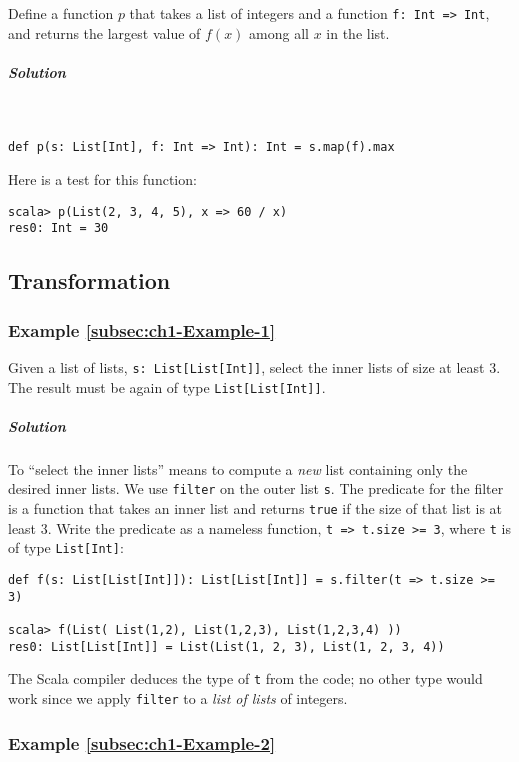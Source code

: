 Define a function $p$ that takes a list of integers and a function
\lstinline!f: Int => Int!, and returns the largest value of $f(x)$
among all $x$ in the list.

\subparagraph{Solution}

~

\begin{lstlisting}
def p(s: List[Int], f: Int => Int): Int = s.map(f).max
\end{lstlisting}
Here is a test for this function:
\begin{lstlisting}
scala> p(List(2, 3, 4, 5), x => 60 / x)
res0: Int = 30
\end{lstlisting}


\subsection{Transformation}

\subsubsection{Example \label{subsec:ch1-Example-1}\ref{subsec:ch1-Example-1}}

Given a list of lists, \lstinline!s: List[List[Int]]!, select the
inner lists of size at least $3$. The result must be again of type
\lstinline!List[List[Int]]!. 

\subparagraph{Solution}

To \textsf{``}select the inner lists\textsf{''} means to compute a \emph{new} list
containing only the desired inner lists. We use \texttt{}\lstinline!filter!
on the outer list \lstinline!s!. The predicate for the filter is
a function that takes an inner list and returns \texttt{}\lstinline!true!
if the size of that list is at least $3$. Write the predicate as
a nameless function, \lstinline!t => t.size >= 3!, where \texttt{}\lstinline!t!
is of type \lstinline!List[Int]!:
\begin{lstlisting}
def f(s: List[List[Int]]): List[List[Int]] = s.filter(t => t.size >= 3)

scala> f(List( List(1,2), List(1,2,3), List(1,2,3,4) ))
res0: List[List[Int]] = List(List(1, 2, 3), List(1, 2, 3, 4)) 
\end{lstlisting}
The Scala compiler deduces the type of \lstinline!t! from the code;
no other type would work since we apply \lstinline!filter! to a \emph{list
of lists} of integers.

\subsubsection{Example \label{subsec:ch1-Example-2}\ref{subsec:ch1-Example-2}}

